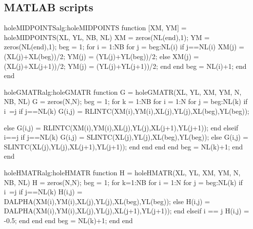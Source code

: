 \subsection{MATLAB scripts}
\label{sub:matlab_scripts4}%

\begin{matlab}{holeMIDPOINTS}{alg:holeMIDPOINTS}
function [XM, YM] = holeMIDPOINTS(XL, YL, NB, NL)
XM = zeros(NL(end),1);
YM = zeros(NL(end),1);
beg = 1;
for i = 1:NB
    for j = beg:NL(i)
        if j==NL(i)
            XM(j) = (XL(j)+XL(beg))/2;
            YM(j) = (YL(j)+YL(beg))/2;
        else
            XM(j) = (XL(j)+XL(j+1))/2;
            YM(j) = (YL(j)+YL(j+1))/2;
        end
    end
    beg = NL(i)+1;
end
end
\end{matlab}

\begin{matlab}{holeGMATR}{alg:holeGMATR}
function G = holeGMATR(XL, YL, XM, YM, N, NB, NL)
G = zeros(N,N); beg = 1;
for k = 1:NB
    for i = 1:N
        for j = beg:NL(k)
            if i~=j %
                if j==NL(k)
                    G(i,j) = RLINTC(XM(i),YM(i),XL(j),YL(j),XL(beg),YL(beg));


                else
                    G(i,j) = RLINTC(XM(i),YM(i),XL(j),YL(j),XL(j+1),YL(j+1));
                end
            elseif i==j %
                if j==NL(k)
                    G(i,j) = SLINTC(XL(j),YL(j),XL(beg),YL(beg));
                else
                    G(i,j) = SLINTC(XL(j),YL(j),XL(j+1),YL(j+1));
                end
            end
        end
    end
    beg = NL(k)+1;
end
end
\end{matlab}

\begin{matlab}{holeHMATR}{alg:holeHMATR}
function H = holeHMATR(XL, YL, XM, YM, N, NB, NL)
H = zeros(N,N);
beg = 1;
for k=1:NB
    for i = 1:N
        for j = beg:NL(k)
            if i~=j %
                if j==NL(k)
                    H(i,j) = DALPHA(XM(i),YM(i),XL(j),YL(j),XL(beg),YL(beg));
                else
                    H(i,j) = DALPHA(XM(i),YM(i),XL(j),YL(j),XL(j+1),YL(j+1));
                end
            elseif i == j %
                H(i,j) = -0.5;
            end
        end
    end
    beg = NL(k)+1;
end
end
\end{matlab}

\newpage


